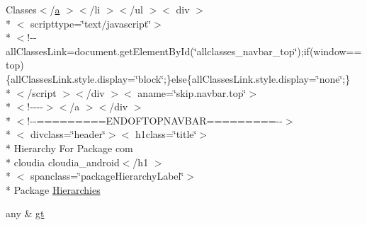 \begin{DoxyCompactItemize}
\item 
Classes$<$/\hyperlink{style_8css_a5e8981582017bb8b84c21f148345d1f7}{a} $>$$<$/li $>$$<$/ul $>$$<$ div $>$\\*
$<$ scripttype=\char`\"{}text/javascript\char`\"{}$>$\\*
$<$!-\/-\/all\-Classes\-Link=document.\-get\-Element\-By\-Id(\char`\"{}allclasses\-\_\-navbar\-\_\-top\char`\"{});if(window==top)\{all\-Classes\-Link.\-style.\-display=\char`\"{}block\char`\"{};\}else\{all\-Classes\-Link.\-style.\-display=\char`\"{}none\char`\"{};\}\\*
$<$/script $>$$<$/div $>$$<$ aname=\char`\"{}skip.\-navbar.\-top\char`\"{}$>$\\*
$<$!-\/-\/-\/-\/$>$$<$/a $>$$<$/div $>$\\*
$<$!-\/-\/=========E\-N\-D\-O\-F\-T\-O\-P\-N\-A\-V\-B\-A\-R=========-\/-\/$>$\\*
$<$ divclass=\char`\"{}header\char`\"{}$>$$<$ h1class=\char`\"{}title\char`\"{}$>$\\*
 Hierarchy For Package com \\*
cloudia cloudia\-\_\-android$<$/h1 $>$\\*
$<$ spanclass=\char`\"{}package\-Hierarchy\-Label\char`\"{}$>$\\*
 Package \hyperlink{com_2cloudia_2cloudia__android_2package-tree_8html_a67dd30bdaba69f030847a823956cbd39}{Hierarchies}
\item 
any \& \hyperlink{com_2cloudia_2cloudia__android_2package-tree_8html_a1bb4447113f0bd7bf49e2b3dee2e065d}{gt}
\end{DoxyCompactItemize}



